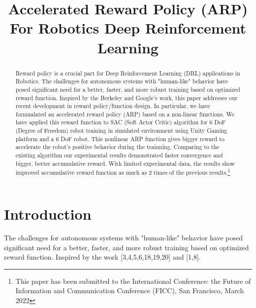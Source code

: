 \documentclass[conference]{IEEEtran}
\begin{document}
 

\title{ 
Accelerated Reward Policy (ARP) For Robotics Deep Reinforcement Learning  
}
 
\author{
} 

\maketitle
\begin{abstract}
Reward policy is a crucial part for Deep Reinforcement Learning (DRL)
applications in Robotics. The challenges for autonomous systems
with "human-like" behavior have posed significant need for a better,
faster, and more robust training based on optimized reward function. 
Inspired by the Berkeley and Google's work, this paper addresses
our recent development in reward policy/function design. In particular, 
we have formualated an accelerated reward policy (ARP) based on 
a non-linear functions. We have applied this reward function 
to SAC (Soft Actor Critic) algorithm for 6 DoF (Degree of Freedom)
robot training in simulated environment using Unity Gaming platform
and a 6 DoF robot. 
This nonlinear ARP  
function gives bigger reward to accelerate the robot's positive 
behavior during the trainning. 
Comparing to the existing algorithm our experimental 
results demonstrated faster convergence and bigger, better  
accumulative reward. With limited experimental data, the results
show improved accumulative reward function as much as 2 times of 
the previous results.\footnote{This paper has been submitted to
the International Conference: the Future of Information and Communication 
Conference (FICC), San Francisco, March 2022}  
\end{abstract}

\IEEEpeerreviewmaketitle

\section{Introduction}
The challenges for autonomous systems
with "human-like" behavior have posed significant need for a better,
faster, and more robust training based on optimized reward function. 
Inspired by the work [3,4,5,6,18,19,20] and [1,8].
\end{document}
